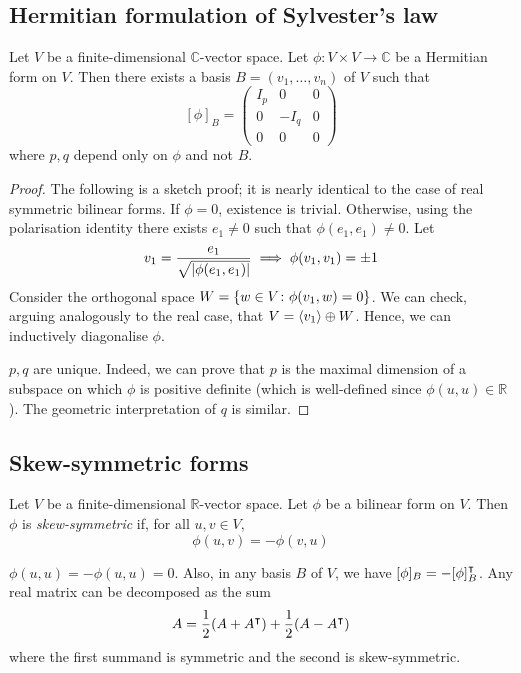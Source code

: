 \subsection{Hermitian formulation of Sylvester's law}
\begin{theorem}
	Let \( V \) be a finite-dimensional \( \mathbb C \)-vector space.
	Let \( \phi \colon V \times V \to \mathbb C \) be a Hermitian form on \( V \).
	Then there exists a basis \( B = (v_1, \dots, v_n) \) of \( V \) such that
	\[
		[\phi]_B = \begin{pmatrix}
			I_p & 0    & 0 \\
			0   & -I_q & 0 \\
			0   & 0    & 0
		\end{pmatrix}
	\]
	where \( p, q \) depend only on \( \phi \) and not \( B \).
\end{theorem}
\begin{proof}
	The following is a sketch proof; it is nearly identical to the case of real symmetric bilinear forms.
	If \( \phi = 0 \), existence is trivial.
	Otherwise, using the polarisation identity there exists \( e_1 \neq 0 \) such that \( \phi(e_1, e_1) \neq 0 \).
	Let
	\[
		v_1 = \frac{e_1}{\sqrt{\abs{\phi(e_1, e_1)}}} \implies \phi(v_1, v_1) = \pm 1
	\]
	Consider the orthogonal space \( W = \qty{w \in V \colon \phi(v_1, w) = 0} \).
	We can check, arguing analogously to the real case, that \( V = \langle{} v_1 \rangle \oplus W \).
	Hence, we can inductively diagonalise \( \phi \).

	\( p, q \) are unique.
	Indeed, we can prove that \( p \) is the maximal dimension of a subspace on which \( \phi \) is positive definite (which is well-defined since \( \phi(u,u) \in \mathbb R \)).
	The geometric interpretation of \( q \) is similar.
\end{proof}

\subsection{Skew-symmetric forms}
\begin{definition}
	Let \( V \) be a finite-dimensional \( \mathbb R \)-vector space.
	Let \( \phi \) be a bilinear form on \( V \).
	Then \( \phi \) is \textit{skew-symmetric} if, for all \( u,v \in V \),
	\[
		\phi(u,v) = -\phi(v,u)
	\]
\end{definition}
\begin{remark}
	\( \phi(u,u) = -\phi(u,u) = 0 \).
	Also, in any basis \( B \) of \( V \), we have \( [\phi]_B = -[\phi]_B^\intercal \).
	Any real matrix can be decomposed as the sum
	\[
		A = \frac{1}{2}\qty(A + A^\intercal) + \frac{1}{2}\qty(A - A^\intercal)
	\]
	where the first summand is symmetric and the second is skew-symmetric.
\end{remark}

